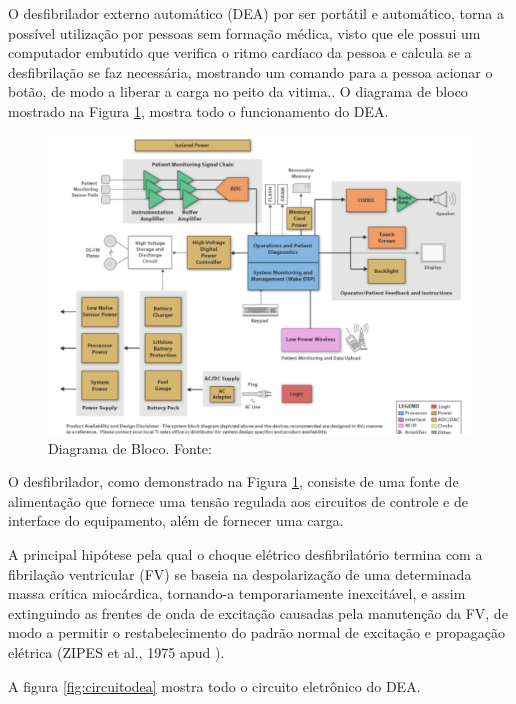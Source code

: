 O desfibrilador externo automático (DEA) por ser portátil e automático, torna a possível utilização por 
pessoas sem formação médica, visto que ele possui um computador embutido que verifica o ritmo cardíaco da 
pessoa e calcula se a desfibrilação se faz necessária, mostrando um comando para a pessoa acionar o botão, de 
modo a liberar a carga no peito da vitima.\cite{3}. O diagrama de bloco mostrado na Figura \ref{fig:dea}, mostra todo o funcionamento do DEA.

\begin{figure}[h!]
	\centering
	  \includegraphics[keepaspectratio=true,scale=0.3]{figuras/dea.png}
	\caption{Diagrama de Bloco. Fonte: \cite{bloco}}
	\label{fig:dea}
\end{figure}

O desfibrilador, como demonstrado na Figura \ref{fig:dea}, consiste de uma fonte  de alimentação que 
fornece uma tensão regulada aos circuitos de controle e de interface do equipamento, além de fornecer uma carga.

A principal hipótese pela qual o choque elétrico desfibrilatório termina com a fibrilação ventricular (FV) se
baseia na despolarização de uma determinada massa crítica miocárdica, tornando-a temporariamente inexcitável, e
assim extinguindo as frentes de onda de excitação causadas pela manutenção da FV, de modo a permitir o 
restabelecimento do padrão normal de excitação e propagação elétrica (ZIPES et al., 1975 apud ).

A figura \ref{fig:circuitodea} mostra todo o circuito eletrônico do DEA.

